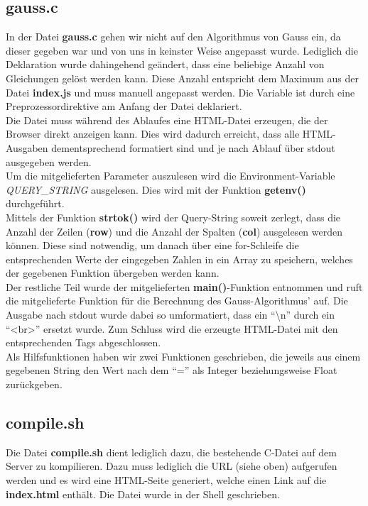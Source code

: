 \documentclass[a4paper,oneside,titlepage,12pt]{article}
\begin{document}
\subsection{gauss.c}
In der Datei \textbf{gauss.c} gehen wir nicht auf den Algorithmus von Gauss ein, da dieser gegeben war und von uns in keinster Weise angepasst wurde. Lediglich die Deklaration wurde dahingehend geändert, dass eine beliebige Anzahl von Gleichungen gelöst werden kann. Diese Anzahl entspricht dem Maximum aus der Datei \textbf{index.js} und muss manuell angepasst werden. Die Variable ist durch eine Preprozessordirektive am Anfang der Datei deklariert. \\ Die Datei muss während des Ablaufes eine HTML-Datei erzeugen, die der Browser direkt anzeigen kann. Dies wird dadurch erreicht, dass alle HTML-Ausgaben dementsprechend formatiert sind und je nach Ablauf über stdout ausgegeben werden. \\ 
Um die mitgelieferten Parameter auszulesen wird die Environment-Variable \textit{QUERY\_STRING} ausgelesen. Dies wird mit der Funktion \textbf{getenv()} durchgeführt. \\ 
Mittels der Funktion \textbf{strtok()} wird der Query-String soweit zerlegt, dass die Anzahl der Zeilen (\textbf{row}) und die Anzahl der Spalten (\textbf{col}) ausgelesen werden können. Diese sind notwendig, um danach über eine for-Schleife die entsprechenden Werte der eingegeben Zahlen in ein Array zu speichern, welches der gegebenen Funktion übergeben werden kann. \\
Der restliche Teil wurde der mitgelieferten \textbf{main()}-Funktion entnommen und ruft die mitgelieferte Funktion für die Berechnung des Gauss-Algorithmus' auf. Die Ausgabe nach stdout wurde dabei so umformatiert, dass ein ``\textbackslash n'' durch ein ``\textless br\textgreater '' ersetzt wurde. Zum Schluss wird die erzeugte HTML-Datei mit den entsprechenden Tags abgeschlossen. \\
Als Hilfsfunktionen haben wir zwei Funktionen geschrieben, die jeweils aus einem gegebenen String den Wert nach dem ``='' als Integer beziehungsweise Float zurückgeben. \\

\subsection{compile.sh}
Die Datei \textbf{compile.sh} dient lediglich dazu, die bestehende C-Datei auf dem Server zu kompilieren. Dazu muss lediglich die URL (siehe oben) aufgerufen werden und es wird eine HTML-Seite generiert, welche einen Link auf die \textbf{index.html} enthält. Die Datei wurde in der Shell geschrieben.
\end{document}
